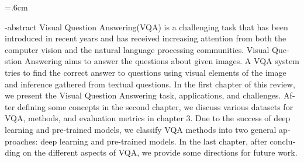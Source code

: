 
\baselineskip=.6cm
\begin{latin}

\en-abstract{
Visual Question Answering(VQA) is a challenging task that has been introduced in recent years and has received increasing attention from both the computer vision and the natural language processing communities. Visual Question Answering aims to answer the questions about given images. A VQA system tries to find the correct answer to questions using visual elements of the image and inference gathered from textual questions. In the first chapter of this review, we present the Visual Question Answering task, applications, and challenges. After defining some concepts in the second chapter, we discuss various datasets for VQA, methods, and evaluation metrics in chapter 3. Due to the success of deep learning and pre-trained models, we classify VQA methods into two general approaches: deep learning and pre-trained models. In the last chapter, after concluding on the different aspects of VQA, we provide some directions for future work.
}
\latinfirstPage
\end{latin}
